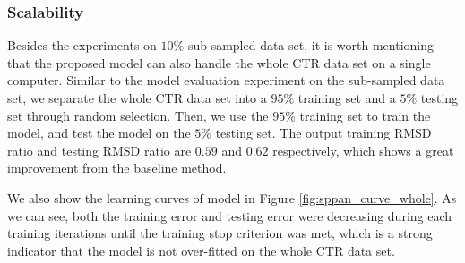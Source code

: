 \subsubsection{Scalability}

Besides the experiments on $10\%$ sub sampled data set, it is worth
mentioning that the proposed {\sppan} model can also handle the whole
CTR data set on a single computer. Similar to the model evaluation
experiment on the sub-sampled data set, we separate the whole CTR data
set  into a $95\%$ training
set and a $5\%$ testing set through random selection. Then, we use the
$95\%$ training set to train the {\sppan} model, and test the model on
the $5\%$ testing set. The output training RMSD ratio and testing RMSD
ratio are $0.59$ and $0.62$ respectively, which shows a great
improvement from the baseline method.

We also show the learning curves of {\sppan} model in Figure
\ref{fig:sppan_curve_whole}. As we can see,  both the training
error and testing error were decreasing  during each
training iterations until the training stop criterion was met, which
is a strong indicator that the {\sppan} model is not over-fitted on the
whole CTR data set.
